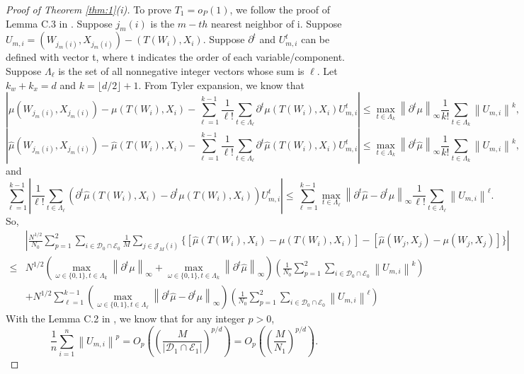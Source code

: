 \documentclass[11pt]{article}
\numberwithin{equation}{section}
\theoremstyle{definition}
\begin{document}
\begin{proof}[Proof of Theorem \ref{thm:1}(i)]
    To prove $T_1=o_P(1)$, we follow the proof of Lemma C.3 in \cite{lin2023estimation}. Suppose $j_m(i)$ is the $m-th$ nearest neighbor of i. Suppose $U_{m,i}=(W_{j_m(i)},X_{j_m(i)})-(T(W_i),X_i)$. Suppose $\partial^t$ and $U_{m,i}^t$ can be defined with vector t, where t indicates the order of each variable/component. Suppose $\Lambda_{\ell}$ is the set of all nonnegative integer vectors whose sum is $\ell$. Let $k_w+k_x=d$ and $k=\lfloor d/2\rfloor+1$. From Tyler expansion, we know that 
\[\left| \mu (W_{j_m(i)},X_{j_m(i)}) - \mu (T(W_i),X_i) - \sum_{\ell=1}^{k-1} \frac{1}{\ell!} \sum_{t \in \Lambda_\ell} \partial^t \mu (T(W_i),X_i) U_{m,i}^t \right| \leq \max_{t \in \Lambda_k} \left\| \partial^t \mu \right\|_\infty \frac{1}{k!} \sum_{t \in \Lambda_k} \left\| U_{m,i} \right\|^k,\]
\[\left| \hat{\mu} (W_{j_m(i)},X_{j_m(i)}) - \hat{\mu} (T(W_i),X_i) - \sum_{\ell=1}^{k-1} \frac{1}{\ell!} \sum_{t \in \Lambda_\ell} \partial^t \hat{\mu} (T(W_i),X_i) U_{m,i}^t \right| \leq \max_{t \in \Lambda_k} \left\| \partial^t \hat{\mu} \right\|_\infty \frac{1}{k!} \sum_{t \in \Lambda_k} \left\| U_{m,i} \right\|^k,\]
and
\[\sum_{\ell=1}^{k-1} \left| \frac{1}{\ell!} \sum_{t \in \Lambda_\ell} (\partial^t \hat{\mu} (T(W_i),X_i) - \partial^t \mu (T(W_i),X_i)) U_{m,i}^t \right| \leq \sum_{\ell=1}^{k-1} \max_{t \in \Lambda_\ell} \left\| \partial^t \hat{\mu} - \partial^t \mu \right\|_\infty \frac{1}{\ell!} \sum_{t \in \Lambda_\ell} \left\| U_{m,i} \right\|^\ell.\]
So,
\begin{align*}
&\left|\frac{N^{1/2}}{N_0}\sum_{p=1}^2\sum_{i\in \mathcal{D}_0\cap\mathcal{E}_0}\frac{1}{M}\sum_{j\in\mathcal{J}_M(i)}\{[\widehat{\mu}(T(W_i),X_i)-\mu(T(W_i),X_i)]-[\widehat{\mu}(W_j,X_j)-\mu(W_j,X_j)]\}\right| \\
\leq& N^{1/2}\left( \max_{\omega \in \{0,1\}, t \in \Lambda_k} \left\| \partial^t \mu \right\|_\infty + \max_{\omega \in \{0,1\}, t \in \Lambda_k} \left\| \partial^t \hat{\mu} \right\|_\infty \right) \left( \frac{1}{N_0} \sum_{p=1}^2\sum_{i\in\mathcal{D}_0\cap\mathcal{E}_0} \left\| U_{m,i} \right\|^k \right)\\
&+ N^{1/2}\sum_{\ell=1}^{k-1} \left( \max_{\omega \in \{0,1\}, t \in \Lambda_\ell} \left\| \partial^t \hat{\mu} - \partial^t \mu \right\|_\infty \right) \left( \frac{1}{N_0} \sum_{p=1}^2\sum_{i\in\mathcal{D}_0\cap\mathcal{E}_0}\left\| U_{m,i} \right\|^\ell \right)
\end{align*}
With the Lemma C.2 in \cite{lin2023estimation}, we know that for any integer $p>0$,
\[\frac{1}{n} \sum_{i=1}^n \left\| U_{m,i} \right\|^p = O_p \left( \left( \frac{M}{|\mathcal{D}_1\cap\mathcal{E}_1|} \right)^{p/d} \right)=O_p \left( \left( \frac{M}{N_1} \right)^{p/d} \right).\]

\end{proof}
\end{document}

